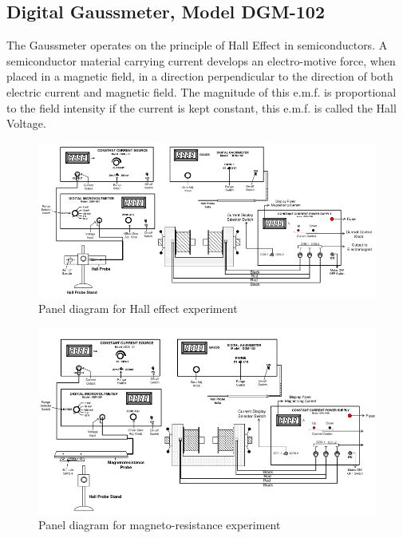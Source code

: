 \documentclass[%
 aip,
 amsmath,amssymb,
 reprint,%
]{revtex4-1}
\begin{document}
    \subsection{Digital Gaussmeter, Model DGM-102}
    The Gaussmeter operates on the principle of Hall Effect in semiconductors. A
    semiconductor material carrying current develops an electro-motive force, when placed
    in a magnetic field, in a direction perpendicular to the direction of both electric current
    and magnetic field. The magnitude of this e.m.f. is proportional to the field intensity if
    the current is kept constant, this e.m.f. is called the Hall Voltage.
    \begin{figure}
        \centering
        \includegraphics{Figures/panel-hall.png}
        \caption{Panel diagram for Hall effect experiment}
        \label{fig:my_label}
    \end{figure}
    \begin{figure}
        \centering
        \includegraphics{Figures/panel-magneto.png}
        \caption{Panel diagram for magneto-resistance experiment}
        \label{fig:my_label}
    \end{figure}
\end{document}
